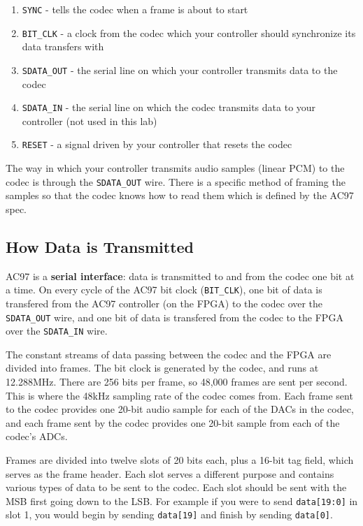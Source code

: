 \documentclass[11pt]{article}
\begin{document}
\begin{enumerate}
	\item \verb|SYNC| - tells the codec when a frame is about to start
	\item \verb|BIT_CLK| - a clock from the codec which your controller should synchronize its data transfers with
	\item \verb|SDATA_OUT| - the serial line on which your controller transmits data to the codec
	\item \verb|SDATA_IN| - the serial line on which the codec transmits data to your controller (not used in this lab)
	\item \verb|RESET| - a signal driven by your controller that resets the codec
\end{enumerate}

The way in which your controller transmits audio samples (linear PCM) to the codec is through the \verb|SDATA_OUT| wire. There is a specific method of framing the samples so that the codec knows how to read them which is defined by the AC97 spec.

\subsection{How Data is Transmitted}
AC97 is a \textbf{serial interface}: data is transmitted to and from the codec one bit at a time. On every cycle of the AC97 bit clock (\verb|BIT_CLK|), one bit of data is transfered from the AC97 controller (on the FPGA) to the codec over the \verb|SDATA_OUT| wire, and one bit of data is transfered from the codec to the FPGA over the \verb|SDATA_IN| wire.

The constant streams of data passing between the codec and the FPGA are divided into frames. The bit clock is generated by the codec, and runs at 12.288MHz. There are 256 bits per frame, so 48,000 frames are sent per second. This is where the 48kHz sampling rate of the codec comes from. Each frame sent to the codec provides one 20-bit audio sample for each of the DACs in the codec, and each frame sent by the codec provides one 20-bit sample from each of the codec's ADCs.

Frames are divided into twelve slots of 20 bits each, plus a 16-bit tag field, which serves as the frame header. Each slot serves a different purpose and contains various types of data to be sent to the codec. Each slot should be sent with the MSB first going down to the LSB. For example if you were to send \verb|data[19:0]| in slot 1, you would begin by sending \verb|data[19]| and finish by sending \verb|data[0]|.
\end{document}
